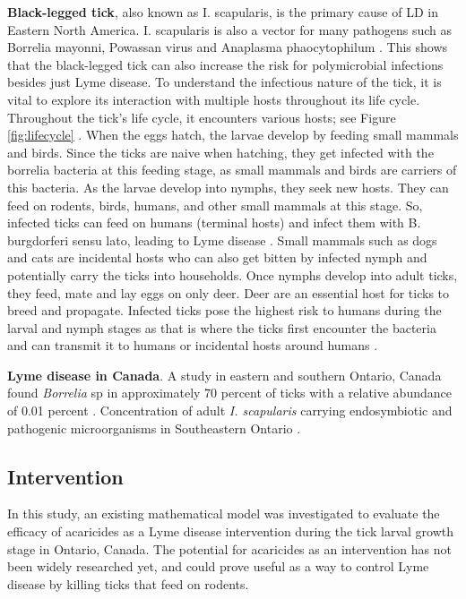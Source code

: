 \documentclass[12pt, centerh1]{article}
\begin{document}
\textbf{Black-legged tick}, also known as I. scapularis, is the primary cause of LD in Eastern North America. I. scapularis is also a vector for many pathogens such as Borrelia mayonni, Powassan virus and Anaplasma phaocytophilum \citep{paulson2023multiomics}. This shows that the black-legged tick can also increase the risk for polymicrobial infections besides just Lyme disease. To understand the infectious nature of the tick, it is vital to explore its interaction with multiple hosts throughout its life cycle. Throughout the tick's life cycle, it encounters various hosts; see Figure \ref{fig:lifecycle} \citep{CDC_2022}\citep{radolf2012ticks}. When the eggs hatch, the larvae develop by feeding small mammals and birds. Since the ticks are naive when hatching, they get infected with the borrelia bacteria at this feeding stage, as small mammals and birds are carriers of this bacteria. As the larvae develop into nymphs, they seek new hosts. They can feed on rodents, birds, humans, and other small mammals at this stage. So, infected ticks can feed on humans (terminal hosts) and infect them with B. burgdorferi sensu lato, leading to Lyme disease \citep{radolf2012ticks}. Small mammals such as dogs and cats are incidental hosts who can also get bitten by infected nymph and potentially carry the ticks into households. Once nymphs develop into adult ticks, they feed, mate and lay eggs on only deer. Deer are an essential host for ticks to breed and propagate. Infected ticks pose the highest risk to humans during the larval and nymph stages as that is where the ticks first encounter the bacteria and can transmit it to humans or incidental hosts around humans \citep{radolf2012ticks}. 

\textbf{Lyme disease in Canada}.
A study in eastern and southern Ontario, Canada found \textit{Borrelia} sp in approximately 70 percent of ticks with a relative abundance of 0.01 percent \citep{clow2018microbiota}. Concentration of adult \textit{I. scapularis} carrying endosymbiotic and pathogenic microorganisms in Southeastern Ontario \citep{paulson2023multiomics}. 


\subsection{Intervention}

In this study, an existing mathematical model was investigated to evaluate the efficacy of acaricides as a Lyme disease intervention during the tick larval growth stage in Ontario, Canada. The potential for acaricides as an intervention has not been widely researched yet, and could prove useful as a way to control Lyme disease by killing ticks that feed on rodents. 
\end{document}
